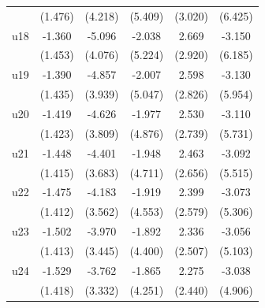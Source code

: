 \begin{table}[htbp]
\begin{tabular}{l*{5}{c}}
                    &     (1.476)         &     (4.218)         &     (5.409)         &     (3.020)         &     (6.425)         \\
\addlinespace
u18                 &      -1.360         &      -5.096         &      -2.038         &       2.669         &      -3.150         \\
                    &     (1.453)         &     (4.076)         &     (5.224)         &     (2.920)         &     (6.185)         \\
\addlinespace
u19                 &      -1.390         &      -4.857         &      -2.007         &       2.598         &      -3.130         \\
                    &     (1.435)         &     (3.939)         &     (5.047)         &     (2.826)         &     (5.954)         \\
\addlinespace
u20                 &      -1.419         &      -4.626         &      -1.977         &       2.530         &      -3.110         \\
                    &     (1.423)         &     (3.809)         &     (4.876)         &     (2.739)         &     (5.731)         \\
\addlinespace
u21                 &      -1.448         &      -4.401         &      -1.948         &       2.463         &      -3.092         \\
                    &     (1.415)         &     (3.683)         &     (4.711)         &     (2.656)         &     (5.515)         \\
\addlinespace
u22                 &      -1.475         &      -4.183         &      -1.919         &       2.399         &      -3.073         \\
                    &     (1.412)         &     (3.562)         &     (4.553)         &     (2.579)         &     (5.306)         \\
\addlinespace
u23                 &      -1.502         &      -3.970         &      -1.892         &       2.336         &      -3.056         \\
                    &     (1.413)         &     (3.445)         &     (4.400)         &     (2.507)         &     (5.103)         \\
\addlinespace
u24                 &      -1.529         &      -3.762         &      -1.865         &       2.275         &      -3.038         \\
                    &     (1.418)         &     (3.332)         &     (4.251)         &     (2.440)         &     (4.906)         \\

\end{tabular}
\end{table}
